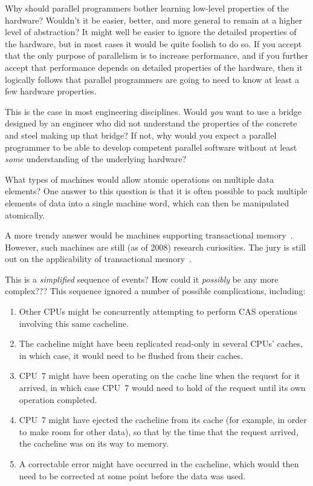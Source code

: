 \QuickQ{}
	Why should parallel programmers bother learning low-level
	properties of the hardware?
	Wouldn't it be easier, better, and more general to remain at
	a higher level of abstraction?
\QuickA{}
	It might well be easier to ignore the detailed properties of
	the hardware, but in most cases it would be quite foolish
	to do so.
	If you accept that the only purpose of parallelism is to
	increase performance, and if you further accept that
	performance depends on detailed properties of the hardware,
	then it logically follows that parallel programmers are going
	to need to know at least a few hardware properties.

	This is the case in most engineering disciplines.
	Would \emph{you} want to use a bridge designed by an
	engineer who did not understand the properties of
	the concrete and steel making up that bridge?
	If not, why would you expect a parallel programmer to be
	able to develop competent parallel software without at least
	\emph{some} understanding of the underlying hardware?

\QuickQ{}
	What types of machines would allow atomic operations on
	multiple data elements?
\QuickA{}
	One answer to this question is that it is often possible to
	pack multiple elements of data into a single machine word,
	which can then be manipulated atomically.

	A more trendy answer would be machines supporting transactional
	memory~\cite{DBLomet1977SIGSOFT}.
	However, such machines are still (as of 2008) research
	curiosities.
	The jury is still out on the applicability of transactional
	memory~\cite{McKenney2007PLOSTM,DonaldEPorter2007TRANSACT,
	ChistopherJRossbach2007a}.

\QuickQ{}
	This is a \emph{simplified} sequence of events?
	How could it \emph{possibly} be any more complex???
\QuickA{}
	This sequence ignored a number of possible complications,
	including:

	\begin{enumerate}
	\item	Other CPUs might be concurrently attempting to perform
		CAS operations involving this same cacheline.
	\item	The cacheline might have been replicated read-only in
		several CPUs' caches, in which case, it would need to
		be flushed from their caches.
	\item	CPU~7 might have been operating on the cache line when
		the request for it arrived, in which case CPU~7 would
		need to hold of the request until its own operation
		completed.
	\item	CPU~7 might have ejected the cacheline from its cache
		(for example, in order to make room for other data),
		so that by the time that the request arrived, the
		cacheline was on its way to memory.
	\item	A correctable error might have occurred in the cacheline,
		which would then need to be corrected at some point before
		the data was used.
	\end{enumerate}

